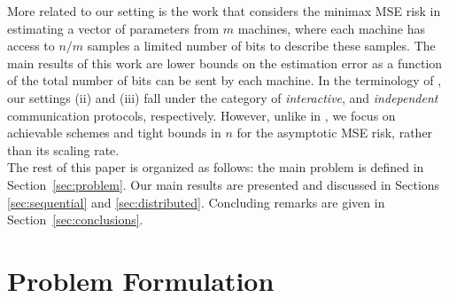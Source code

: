 \documentclass[letterpaper, conference]{IEEEtran}      %
\begin{document}
More related to our setting is the work \cite{zhang2013information} that considers the minimax MSE risk in estimating a vector of parameters from $m$ machines, where each machine has access to $n/m$ samples a limited number of bits to describe these samples. The main results of this work are lower bounds on the estimation error as a function of the total number of bits can be sent by each machine. In the terminology of \cite{zhang2013information}, our settings (ii) and (iii) fall under the category of \emph{interactive}, and  \emph{independent} communication protocols, respectively. %
However, unlike in \cite{zhang2013information}, we focus on achievable schemes and tight bounds in $n$ for the asymptotic MSE risk, rather than its scaling rate. \\

The rest of this paper is organized as follows: the main problem is defined in Section~\ref{sec:problem}. Our main results are presented and discussed in Sections~ \ref{sec:sequential} and \ref{sec:distributed}. Concluding remarks are given in Section~\ref{sec:conclusions}.






\section{Problem Formulation \label{sec:problem}}
\end{document}

